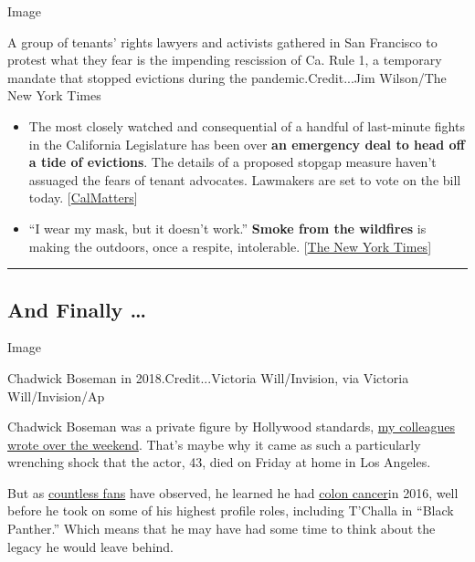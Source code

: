 Image

A group of tenants' rights lawyers and activists gathered in San
Francisco to protest what they fear is the impending rescission of Ca.
Rule 1, a temporary mandate that stopped evictions during the
pandemic.Credit...Jim Wilson/The New York Times

\begin{itemize}
\item
  The most closely watched and consequential of a handful of last-minute
  fights in the California Legislature has been over \textbf{an
  emergency deal to head off a tide of evictions}. The details of a
  proposed stopgap measure haven't assuaged the fears of tenant
  advocates. Lawmakers are set to vote on the bill today.
  {[}\href{https://calmatters.org/housing/2020/08/california-newsom-pandemic-eviction-deal/}{CalMatters}{]}
\item
  ``I wear my mask, but it doesn't work.'' \textbf{Smoke from the
  wildfires} is making the outdoors, once a respite, intolerable.
  {[}\href{https://www.nytimes3xbfgragh.onion/2020/08/28/us/california-fires-smoke.html}{The
  New York Times}{]}
\end{itemize}

\begin{center}\rule{0.5\linewidth}{\linethickness}\end{center}

\hypertarget{and-finally-}{%
\subsection{And Finally \ldots{}}\label{and-finally-}}

Image

Chadwick Boseman in 2018.Credit...Victoria Will/Invision, via Victoria
Will/Invision/Ap

Chadwick Boseman was a private figure by Hollywood standards,
\href{https://www.nytimes3xbfgragh.onion/2020/08/28/movies/chadwick-boseman-dead.html}{my
colleagues wrote over the weekend}. That's maybe why it came as such a
particularly wrenching shock that the actor, 43, died on Friday at home
in Los Angeles.

But as
\href{https://www.nytimes3xbfgragh.onion/2020/08/28/movies/chadwick-boseman-reaction.html}{countless
fans} have observed, he learned he had
\href{https://www.nytimes3xbfgragh.onion/2020/08/29/health/colon-cancer-chadwick-boseman.html?action=click\&module=RelatedLinks\&pgtype=Article}{colon
cancer}in 2016, well before he took on some of his highest profile
roles, including T'Challa in ``Black Panther.'' Which means that he may
have had some time to think about the legacy he would leave behind.

